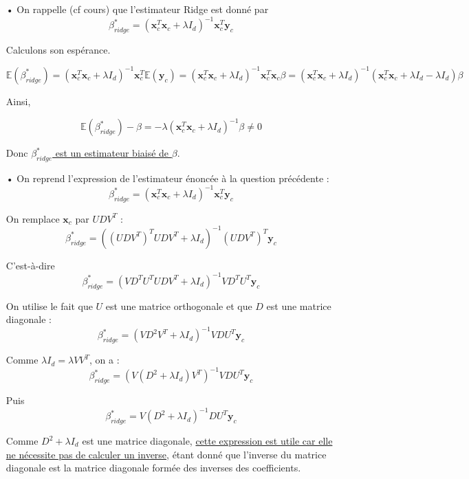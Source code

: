 \documentclass[a4paper, 10pt]{article}
\newcommand{\E}{\mathbb{E}}
\begin{document}
\begin{itemize}

	\item[•] On rappelle (cf cours) que l'estimateur Ridge est donné par \[ \beta_{ridge}^{*} = \left( \textbf{x}_{c}^{T}\textbf{x}_{c} + \lambda I_{d} \right)^{-1}\textbf{x}_{c}^{T}\textbf{y}_{c} \]

Calculons son espérance.

\[ \E \left( \beta_{ridge}^{*} \right) = \left( \textbf{x}_{c}^{T}\textbf{x}_{c} + \lambda I_{d} \right)^{-1}\textbf{x}_{c}^{T} \E \left( \textbf{y}_{c} \right) = \left( \textbf{x}_{c}^{T}\textbf{x}_{c} + \lambda I_{d} \right)^{-1}\textbf{x}_{c}^{T} \textbf{x}_{c} \beta = \left( \textbf{x}_{c}^{T}\textbf{x}_{c} + \lambda I_{d} \right)^{-1} \left( \textbf{x}_{c}^{T} \textbf{x}_{c} + \lambda I_{d} - \lambda I_{d} \right) \beta \]

Ainsi,

\[ \boxed{\E \left( \beta_{ridge}^{*} \right) - \beta = - \lambda \left( \textbf{x}_{c}^{T}\textbf{x}_{c} + \lambda I_{d} \right)^{-1} \beta \neq 0} \]

Donc \underline{$\beta_{ridge}^{*}$ est un estimateur biaisé de $\beta$}.

	\item[•] On reprend l'expression de l'estimateur énoncée à la question précédente : \[ \beta_{ridge}^{*} = \left( \textbf{x}_{c}^{T}\textbf{x}_{c} + \lambda I_{d} \right)^{-1}\textbf{x}_{c}^{T}\textbf{y}_{c} \]

On remplace $\textbf{x}_{c}$ par $UDV^{T}$ : \[ \beta_{ridge}^{*} = \left( \left( UDV^{T} \right)^{T}UDV^{T} + \lambda I_{d} \right)^{-1}\left( UDV^{T} \right)^{T}\textbf{y}_{c} \]

C'est-à-dire \[ \beta_{ridge}^{*} = \left( VD^{T}U^{T}UDV^{T} + \lambda I_{d} \right)^{-1} VD^{T}U^{T} \textbf{y}_{c} \]

On utilise le fait que $U$ est une matrice orthogonale et que $D$ est une matrice diagonale : \[ \beta_{ridge}^{*} = \left( VD^{2}V^{T} + \lambda I_{d} \right)^{-1} VDU^{T} \textbf{y}_{c} \]

Comme $ \lambda I_{d} = \lambda VV^{T}$, on a : \[ \beta_{ridge}^{*} = \left( V \left( D^{2} + \lambda I_{d} \right)V^{T} \right)^{-1} VDU^{T} \textbf{y}_{c} \]

Puis \[ \boxed{\beta_{ridge}^{*} = V \left( D^{2} + \lambda I_{d} \right)^{-1} DU^{T} \textbf{y}_{c}} \]

Comme $D^{2} + \lambda I_{d}$ est une matrice diagonale, \underline{cette expression est utile car elle ne nécessite pas de calculer un inverse}, étant donné que l'inverse du matrice diagonale est la matrice diagonale formée des inverses des coefficients.


\end{itemize}
\end{document}
